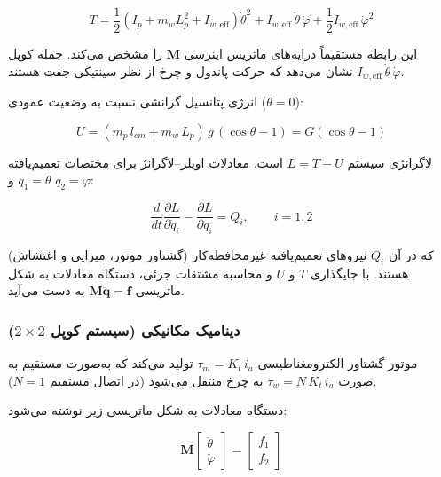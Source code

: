 \begin{equation}
    T = \frac{1}{2}(I_p + m_w L_p^2 + I_{w,\text{eff}})\dot{\theta}^2
      + I_{w,\text{eff}}\,\dot{\theta}\,\dot{\varphi}
      + \frac{1}{2} I_{w,\text{eff}}\,\dot{\varphi}^2
\end{equation}

این رابطه مستقیماً درایه‌های ماتریس اینرسی $\mathbf{M}$ را مشخص می‌کند. جمله کوپل $I_{w,\text{eff}}\,\dot{\theta}\,\dot{\varphi}$ نشان می‌دهد که حرکت پاندول و چرخ از نظر سینتیکی جفت هستند.

انرژی پتانسیل گرانشی نسبت به وضعیت عمودی ($\theta = 0$):

\begin{equation}
    U = (m_p \, l_{cm} + m_w \, L_p)\, g \, (\cos\theta - 1) = G(\cos\theta - 1)
\end{equation}

لاگرانژی سیستم $L = T - U$ است. معادلات اویلر--لاگرانژ برای مختصات تعمیم‌یافته $q_1 = \theta$ و $q_2 = \varphi$:

\begin{equation}
    \frac{d}{dt}\frac{\partial L}{\partial \dot{q}_i} - \frac{\partial L}{\partial q_i} = Q_i, \qquad i = 1, 2
\end{equation}

که در آن $Q_i$ نیروهای تعمیم‌یافته غیرمحافظه‌کار (گشتاور موتور، میرایی و اغتشاش) هستند. با جایگذاری $T$ و $U$ و محاسبه مشتقات جزئی، دستگاه معادلات به شکل ماتریسی $\mathbf{M}\ddot{\mathbf{q}} = \mathbf{f}$ به دست می‌آید.

\subsubsection{دینامیک مکانیکی (سیستم کوپل $2 \times 2$)}

موتور گشتاور الکترومغناطیسی $\tau_m = K_t \, i_a$ تولید می‌کند که به‌صورت مستقیم به صورت $\tau_w = N \, K_t \, i_a$ به چرخ منتقل می‌شود (در اتصال مستقیم $N=1$).

دستگاه معادلات به شکل ماتریسی زیر نوشته می‌شود:

\begin{equation}
    \mathbf{M} \begin{bmatrix} \ddot{\theta} \\ \ddot{\varphi} \end{bmatrix} = \begin{bmatrix} f_1 \\ f_2 \end{bmatrix}
\end{equation}

